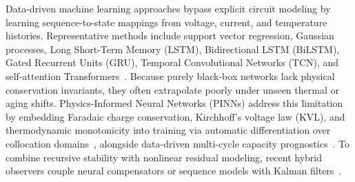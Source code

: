 \documentclass[10pt,a4paper]{article}
\begin{document}
Data-driven machine learning approaches bypass explicit circuit modeling by learning sequence-to-state mappings from voltage, current, and temperature histories. Representative methods include support vector regression, Gaussian processes, Long Short-Term Memory (LSTM), Bidirectional LSTM (BiLSTM), Gated Recurrent Units (GRU), Temporal Convolutional Networks (TCN), and self-attention Transformers~\cite{Hansen2005svr,Chemali2018dnn,Liu2020gpr,Song2019bilstm,Jiao2020attn,Liu2021tcn,Vaswani2017attention}. Because purely black-box networks lack physical conservation invariants, they often extrapolate poorly under unseen thermal or aging shifts. Physics-Informed Neural Networks (PINNs) address this limitation by embedding Faradaic charge conservation, Kirchhoff's voltage law (KVL), and thermodynamic monotonicity into training via automatic differentiation over collocation domains~\cite{Raissi2019pinn,Wang2024xjtu,Abbasi2025pinn_jes,Zhou2025dualstream_jes,Brancato2026}, alongside data-driven multi-cycle capacity prognostics~\cite{Li2021oneshot}. To combine recursive stability with nonlinear residual modeling, recent hybrid observers couple neural compensators or sequence models with Kalman filters~\cite{Charkhgard2010dekf,Tu2023hybrid,Wang2024aekf_lstm,Shen2025kf,Yu2025lstm_ekf}.
\end{document}
